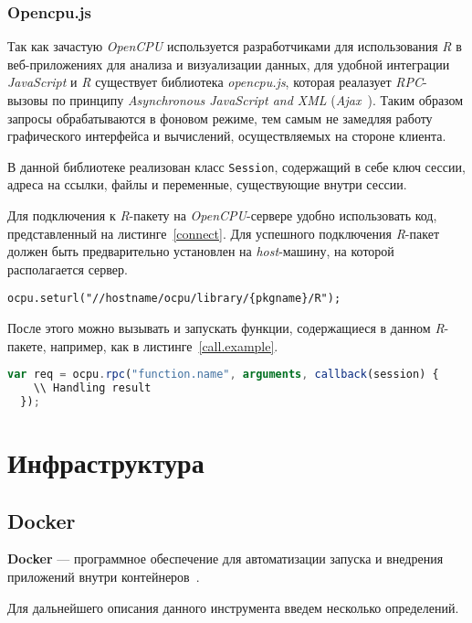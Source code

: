 \subsubsection{Opencpu.js}
Так как зачастую \emph{OpenCPU} используется разработчиками для использования \emph{R} в веб-приложениях для анализа и визуализации данных, для удобной интеграции \emph{JavaScript} и \emph{R} существует библиотека \textit{opencpu.js}, которая реалазует \emph{RPC}-вызовы по принципу \emph{Asynchronous JavaScript and XML} (\emph{Ajax}~\cite{ajax}). Таким образом запросы обрабатываются в фоновом режиме, тем самым не замедляя работу графического интерфейса и вычислений, осуществляемых на стороне клиента.

В данной библиотеке реализован класс \texttt{Session}, содержащий в себе ключ сессии, адреса на ссылки, файлы и переменные, существующие внутри сессии.

Для подключения к \emph{R}-пакету на \emph{OpenCPU}-сервере удобно использовать код, представленный на листинге~\ref{connect}. Для успешного подключения \emph{R}-пакет должен быть предварительно установлен на \emph{host}-машину, на которой располагается сервер. 

\begin{lstlisting}[float=!h,caption={Подключение к \emph{R}-пакету},label={connect}]
  ocpu.seturl("//hostname/ocpu/library/{pkgname}/R");
\end{lstlisting}
После этого можно вызывать и запускать функции, содержащиеся в данном \emph{R}-пакете, например, как в листинге~\ref{call.example}.

\begin{lstlisting}[float=!h,caption={Шаблон вызова \emph{R}-функции из \emph{JavaScript}},label={call.example},language=JavaScript]
  var req = ocpu.rpc("function.name", arguments, callback(session) {
    \\ Handling result
  });
\end{lstlisting}

\section{Инфраструктура}
\subsection{Docker}
\textbf{Docker} --- программное обеспечение для автоматизации запуска и внедрения приложений внутри контейнеров~\cite{docker}.

Для дальнейшего описания данного инструмента введем несколько определений.

